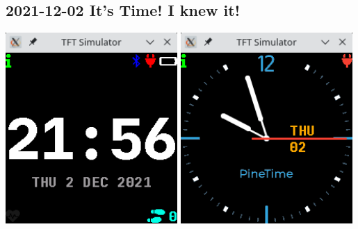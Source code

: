 \documentclass{beamer}
\begin{document}
\subsection{2021-12-02 It's Time! I knew it!}
\begin{frame}{}
  \centering\includegraphics[width=0.49\textwidth]{../2021-12-02_WatchFaceDigital_notified}
  \centering\includegraphics[width=0.49\textwidth]{../2021-12-02_WatchFaceAnalog_notified}
\end{frame}
\end{document}
